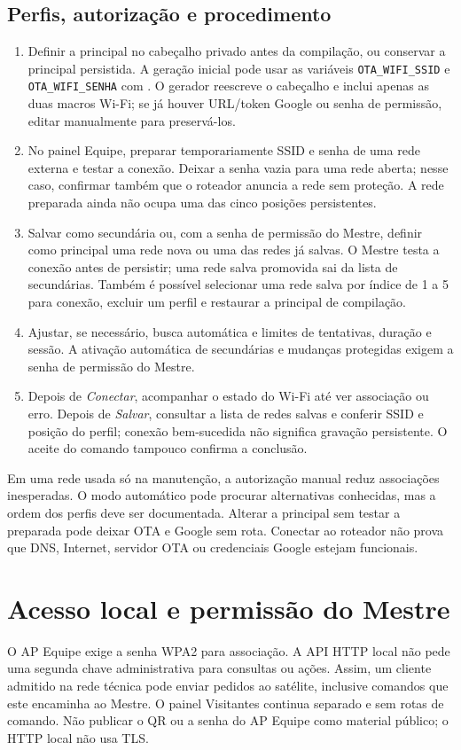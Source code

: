 \subsection{Perfis, autorização e procedimento}\label{sec:perfis-wifi}
\begin{enumerate}
  \item Definir a principal no cabeçalho privado antes da compilação, ou conservar a principal persistida. A geração inicial pode usar as variáveis \texttt{OTA\_WIFI\_SSID} e \texttt{OTA\_WIFI\_SENHA} com . O gerador reescreve o cabeçalho e inclui apenas as duas macros Wi-Fi; se já houver URL/token Google ou senha de permissão, editar manualmente para preservá-los.
  \item No painel Equipe, preparar temporariamente SSID e senha de uma rede externa e testar a conexão. Deixar a senha vazia para uma rede aberta; nesse caso, confirmar também que o roteador anuncia a rede sem proteção. A rede preparada ainda não ocupa uma das cinco posições persistentes.
  \item Salvar como secundária ou, com a senha de permissão do Mestre, definir como principal uma rede nova ou uma das redes já salvas. O Mestre testa a conexão antes de persistir; uma rede salva promovida sai da lista de secundárias. Também é possível selecionar uma rede salva por índice de 1 a 5 para conexão, excluir um perfil e restaurar a principal de compilação.
  \item Ajustar, se necessário, busca automática e limites de tentativas, duração e sessão. A ativação automática de secundárias e mudanças protegidas exigem a senha de permissão do Mestre.
  \item Depois de \emph{Conectar}, acompanhar o estado do Wi-Fi até ver associação ou erro. Depois de \emph{Salvar}, consultar a lista de redes salvas e conferir SSID e posição do perfil; conexão bem-sucedida não significa gravação persistente. O aceite do comando tampouco confirma a conclusão.
\end{enumerate}
Em uma rede usada só na manutenção, a autorização manual reduz associações inesperadas. O modo automático pode procurar alternativas conhecidas, mas a ordem dos perfis deve ser documentada. Alterar a principal sem testar a preparada pode deixar OTA e Google sem rota. Conectar ao roteador não prova que DNS, Internet, servidor OTA ou credenciais Google estejam funcionais.

\section{Acesso local e permissão do Mestre}\label{sec:acesso-web}
O AP Equipe exige a senha WPA2 para associação. A API HTTP local não pede uma segunda chave administrativa para consultas ou ações. Assim, um cliente admitido na rede técnica pode enviar pedidos ao satélite, inclusive comandos que este encaminha ao Mestre. O painel Visitantes continua separado e sem rotas de comando. Não publicar o QR ou a senha do AP Equipe como material público; o HTTP local não usa TLS.

